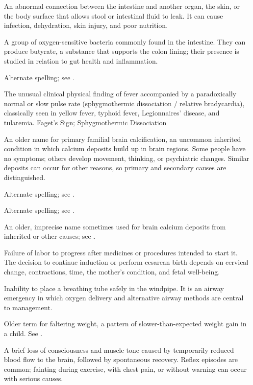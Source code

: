 An abnormal connection between the intestine and another organ, the skin, or the body surface that allows stool or intestinal fluid to leak. It can cause infection, dehydration, skin injury, and poor nutrition.

 A group of oxygen-sensitive bacteria commonly found in the intestine. They can produce butyrate, a substance that supports the colon lining; their presence is studied in relation to gut health and inflammation.

 Alternate spelling; see .

 The unusual clinical physical finding of fever accompanied by a paradoxically normal or slow pulse rate (sphygmothermic dissociation / relative bradycardia), classically seen in yellow fever, typhoid fever, Legionnaires' disease, and tularemia.
\synonyms
Faget's Sign; Sphygmothermic Dissociation

 An older name for primary familial brain calcification, an uncommon inherited condition in which calcium deposits build up in brain regions. Some people have no symptoms; others develop movement, thinking, or psychiatric changes. Similar deposits can occur for other reasons, so primary and secondary causes are distinguished.

 Alternate spelling; see .

 Alternate spelling; see .

 An older, imprecise name sometimes used for brain calcium deposits from inherited or other causes; see .

 Failure of labor to progress after medicines or procedures intended to start it. The decision to continue induction or perform cesarean birth depends on cervical change, contractions, time, the mother’s condition, and fetal well-being.

 Inability to place a breathing tube safely in the windpipe. It is an airway emergency in which oxygen delivery and alternative airway methods are central to management.

 Older term for faltering weight, a pattern of slower-than-expected weight gain in a child. See .

 A brief loss of consciousness and muscle tone caused by temporarily reduced blood flow to the brain, followed by spontaneous recovery. Reflex episodes are common; fainting during exercise, with chest pain, or without warning can occur with serious causes.


